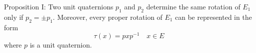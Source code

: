 Proposition I: Two unit quaternions $p_1$ and $p_2$ determine the same rotation of $E_1$ only if $p_2 = \pm p_1$. Moreover, every proper rotation of $E_1$ can be represented in the form
$$\tau(x) = pxp^{-1} \quad x \in E$$
where $p$ is a unit quaternion.
